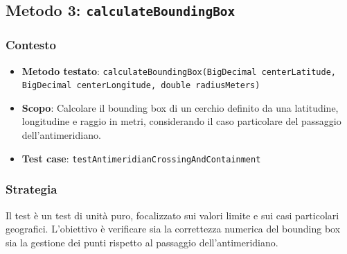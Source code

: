 \documentclass{book}
\begin{document}
\subsection{Metodo 3: \texttt{calculateBoundingBox}}

\subsubsection{Contesto}
\begin{itemize}
\item \textbf{Metodo testato}: \texttt{calculateBoundingBox(BigDecimal centerLatitude,\\
BigDecimal centerLongitude, double radiusMeters)}
\item \textbf{Scopo}: Calcolare il bounding box di un cerchio definito da una latitudine, longitudine e raggio in metri, considerando il caso particolare del passaggio dell'antimeridiano.
\item \textbf{Test case}: \texttt{testAntimeridianCrossingAndContainment}
\end{itemize}

\subsubsection{Strategia}
Il test è un test di unità puro, focalizzato sui valori limite e sui casi particolari geografici. L’obiettivo è verificare sia la correttezza numerica del bounding box sia la gestione dei punti rispetto al passaggio dell’antimeridiano.
\end{document}
